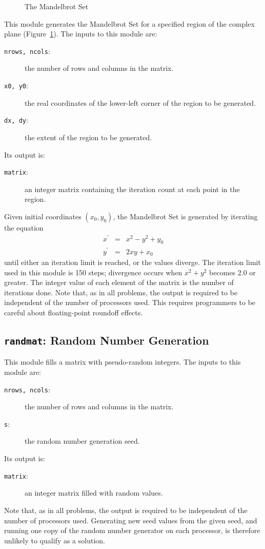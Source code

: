 \begin{figure}
\begin{center}\end{center}
\caption{The Mandelbrot Set\label{f:mandel}}
\end{figure}

This module generates the Mandelbrot Set
for a specified region of the complex plane
(Figure~\ref{f:mandel}).
The inputs to this module are:
\begin{description}
\item[{\tt{nrows, ncols}}:]
	the number of rows and columns in the matrix.
\item[{\tt{x0, y0}}:]
	the real coordinates of the lower-left corner
	of the region to be generated.
\item[{\tt{dx, dy}}:]
	the extent of the region to be generated.
\end{description}
Its output is:
\begin{description}
\item[{\tt{matrix}}:]
	an integer matrix containing the iteration count at each point in the region.
\end{description}

Given initial coordinates $(x_0, y_0)$,
the Mandelbrot Set is generated by iterating the equation
\begin{eqnarray*}
x^{\prime}	& =	& x^2 - y^2 + y_0	\\
y^{\prime}	& =	& 2{x}{y} + x_0
\end{eqnarray*}
until either an iteration limit is reached,
or the values diverge.
The iteration limit used in this module is 150 steps;
divergence occurs when $x^2 + y^2$ becomes 2.0 or greater.
The integer value of each element of the matrix is
the number of iterations done.
Note that,
as in all problems,
the output is required to be
independent of the number of processors used.
This requires programmers to be careful about
floating-point roundoff effects.

\subsection{{\tt{randmat}}:
	Random Number Generation
	\label{s:toys-rng}}

This module fills a matrix with pseudo-random integers.
The inputs to this module are:
\begin{description}
\item[{\tt{nrows, ncols}}:]
	the number of rows and columns in the matrix.
\item[{\tt{s}}:]
	the random number generation seed.
\end{description}
Its output is:
\begin{description}
\item[{\tt{matrix}}:]
	an integer matrix filled with random values.
\end{description}
Note that,
as in all problems,
the output is required to be independent of the number of processors used.
Generating new seed values from the given seed,
and running one copy of the random number generator
on each processor,
is therefore unlikely to qualify as a solution.

